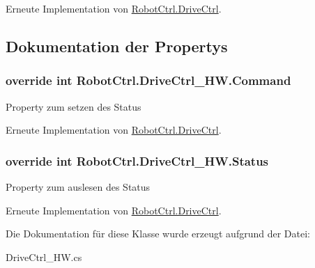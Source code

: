 Erneute Implementation von \hyperlink{class_robot_ctrl_1_1_drive_ctrl_a721795047bfe5d2cca3fab6eeb0ab905}{RobotCtrl.DriveCtrl}.



\subsection{Dokumentation der Propertys}
\hypertarget{class_robot_ctrl_1_1_drive_ctrl___h_w_acc8cbfa5af4849ee85babc540ad63ada}{
\subsubsection[{Command}]{\setlength{\rightskip}{0pt plus 5cm}override int RobotCtrl.DriveCtrl\_\-HW.Command}}
\label{class_robot_ctrl_1_1_drive_ctrl___h_w_acc8cbfa5af4849ee85babc540ad63ada}
Property zum setzen des Status 

Erneute Implementation von \hyperlink{class_robot_ctrl_1_1_drive_ctrl_a45359565bdcb6293ed723acb48cae18b}{RobotCtrl.DriveCtrl}.

\hypertarget{class_robot_ctrl_1_1_drive_ctrl___h_w_ab77cfbe90640881ca1e051fab36f02ac}{
\subsubsection[{Status}]{\setlength{\rightskip}{0pt plus 5cm}override int RobotCtrl.DriveCtrl\_\-HW.Status}}
\label{class_robot_ctrl_1_1_drive_ctrl___h_w_ab77cfbe90640881ca1e051fab36f02ac}
Property zum auslesen des Status 

Erneute Implementation von \hyperlink{class_robot_ctrl_1_1_drive_ctrl_a462a4b74b24efb494df863d1ac249b45}{RobotCtrl.DriveCtrl}.



Die Dokumentation für diese Klasse wurde erzeugt aufgrund der Datei:\begin{DoxyCompactItemize}
\item 
DriveCtrl\_\-HW.cs\end{DoxyCompactItemize}
